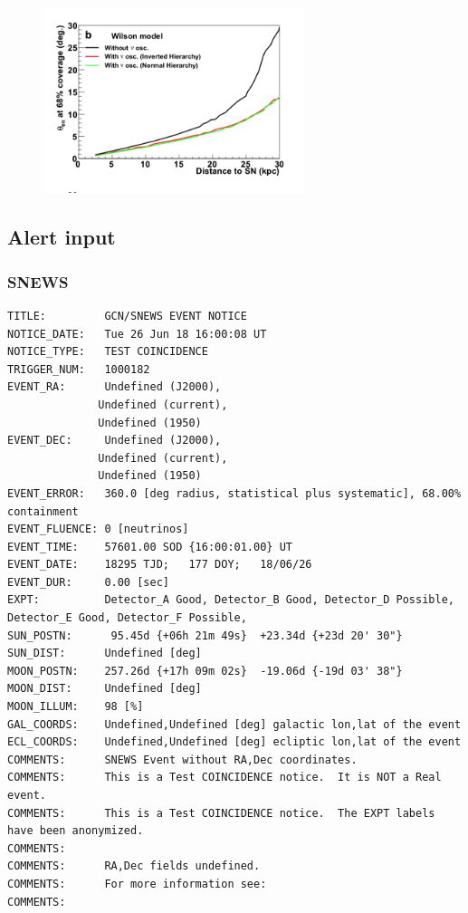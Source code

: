 \documentclass[11pt]{article}
\begin{document}
\begin{figure}
  \begin{center}
    \includegraphics[width=3.0in]{SK-realtime-pointing-resolution}
    \caption{}
    \label{fig:SK-realtime-pointing-resolution}
  \end{center}
\end{figure}

\subsection{Alert input}

\subsubsection{SNEWS}

\begin{verbatim}
TITLE:         GCN/SNEWS EVENT NOTICE
NOTICE_DATE:   Tue 26 Jun 18 16:00:08 UT
NOTICE_TYPE:   TEST COINCIDENCE
TRIGGER_NUM:   1000182
EVENT_RA:      Undefined (J2000),
              Undefined (current),
              Undefined (1950)
EVENT_DEC:     Undefined (J2000),
              Undefined (current),
              Undefined (1950)
EVENT_ERROR:   360.0 [deg radius, statistical plus systematic], 68.00% containment
EVENT_FLUENCE: 0 [neutrinos]
EVENT_TIME:    57601.00 SOD {16:00:01.00} UT
EVENT_DATE:    18295 TJD;   177 DOY;   18/06/26
EVENT_DUR:     0.00 [sec]
EXPT:          Detector_A Good, Detector_B Good, Detector_D Possible, Detector_E Good, Detector_F Possible, 
SUN_POSTN:      95.45d {+06h 21m 49s}  +23.34d {+23d 20' 30"}
SUN_DIST:      Undefined [deg]
MOON_POSTN:    257.26d {+17h 09m 02s}  -19.06d {-19d 03' 38"}
MOON_DIST:     Undefined [deg]
MOON_ILLUM:    98 [%]
GAL_COORDS:    Undefined,Undefined [deg] galactic lon,lat of the event
ECL_COORDS:    Undefined,Undefined [deg] ecliptic lon,lat of the event
COMMENTS:      SNEWS Event without RA,Dec coordinates.  
COMMENTS:      This is a Test COINCIDENCE notice.  It is NOT a Real event.  
COMMENTS:      This is a Test COINCIDENCE notice.  The EXPT labels have been anonymized.  
COMMENTS:         
COMMENTS:      RA,Dec fields undefined.  
COMMENTS:      For more information see:  
COMMENTS:
\end{verbatim}
\end{document}
